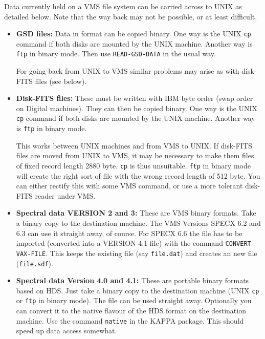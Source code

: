 \documentclass[twoside,11pt,nolof]{starlink}
\begin{document}
Data currently held on a VMS file system can be carried across to UNIX
as detailed below. Note that the way back may not be possible, or at
least difficult.
\begin{itemize}
\item \textbf{GSD files:}
    Data in  format can be copied binary. One way is the
    UNIX \texttt{cp} command if both disks are mounted by the UNIX machine.
    Another way is \texttt{ftp} in binary mode. Then use \texttt{READ-GSD-DATA} in the usual way.

    For going back from UNIX to VMS similar problems may arise as with
    disk-FITS files (see below).

\item \textbf{Disk-FITS files:}
    These must be written with IBM byte order (swap order
    on Digital machines). They can then be copied binary. One way is the
    UNIX \texttt{cp} command if both disks are mounted by the UNIX machine.
    Another way is \texttt{ftp} in binary mode.

    This works between UNIX machines and from VMS to UNIX. If disk-FITS
    files are moved from UNIX to VMS, it may be necessary to make them
    files of fixed record length 2880 byte. \texttt{cp} is thus unsuitable.
    \texttt{ftp} in binary mode will create the right sort of file with the
    wrong record length of 512 byte. You can either rectify this with
    some VMS command, or use a more tolerant disk-FITS reader under VMS.

\item \textbf{Spectral data VERSION 2 and 3:}
    These are VMS binary formats. Take a
    binary copy to the destination machine. The VMS Versions SPECX 6.2
    and 6.3 can use it straight away, of course. For SPECX 6.6 the file
    has to be imported (converted into a VERSION 4.1 file) with the
    command \texttt{CONVERT-VAX-FILE}. This keeps the existing file (say
    \texttt{file.dat}) and creates an new file (\texttt{file.sdf}).

\item \textbf{Spectral data Version 4.0 and 4.1:}
    These are portable binary formats
    based on HDS. Just take a binary copy to the destination machine
    (UNIX \texttt{cp} or \texttt{ftp} in binary mode). The file can be used straight
    away. Optionally you can convert it to the native flavour of the HDS
    format on the destination machine. Use the command \texttt{native} in the
    KAPPA package. This should speed up data access somewhat.


\end{itemize}
\end{document}

